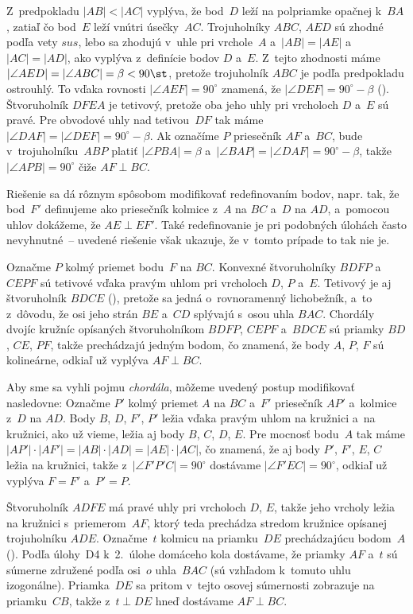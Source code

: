 {%
Z~predpokladu $|AB|<|AC|$ vyplýva, že bod~$D$
leží na polpriamke opačnej k~$BA$, zatiaľ čo bod~$E$ leží vnútri
úsečky~$AC$. Trojuholníky $ABC$, $AED$ sú zhodné podľa
vety $sus$, lebo sa zhodujú v~uhle pri vrchole~$A$
a~$|AB| = |AE|$ a~$|AC| = |AD|$, ako vyplýva
z~definície bodov $D$ a~$E$. Z~tejto zhodnosti máme
$|\angle AED| = |\angle ABC| =\beta<90\st$, pretože trojuholník $ABC$
je podľa predpokladu ostrouhlý. To vďaka rovnosti ${|\angle
AEF| = 90^\circ}$ znamená, že $|\angle DEF| = 90^\circ- \beta$ (\obr).
Štvoruholník $DFEA$ je tetivový, pretože oba jeho uhly pri vrcholoch
$D$ a~$E$ sú pravé. Pre obvodové uhly nad tetivou~$DF$ tak máme
$|\angle DAF|=|\angle DEF|= 90^\circ-\beta$. Ak označíme $P$
priesečník $AF$ a~$BC$, bude v~trojuholníku~$ABP$ platiť $|\angle
PBA| = \beta$ a~$|\angle BAP| = |\angle DAF| = 90^\circ- \beta$, takže
$|\angle APB| = 90^\circ$ čiže $AF \perp BC$.

\poznamka
Riešenie sa dá rôznym spôsobom
modifikovať redefinovaním bodov, napr. tak, že bod~$F'$ definujeme
ako priesečník kolmice z~$A$ na $BC$ a~$D$ na $AD$, a~pomocou uhlov
dokážeme, že $AE \perp EF'$. Také redefinovanie je pri podobných úlohách často
nevyhnutné~-- uvedené riešenie však ukazuje, že v~tomto prípade to tak nie je.
%

Označme $P$ kolmý priemet bodu~$F$ na $BC$.
Konvexné štvoruholníky $BDFP$ a~$CEPF$ sú tetivové vďaka pravým
uhlom pri vrcholoch $D$, $P$ a~$E$. Tetivový je aj štvoruholník
$BDCE$ (\obr), pretože sa jedná o~rovnoramenný lichobežník, a~to
z~dôvodu, že osi jeho strán $BE$ a~$CD$ splývajú s~osou uhla $BAC$.
Chordály dvojíc kružníc
opísaných štvoruholníkom $BDFP$, $CEPF$ a~$BDCE$ sú priamky
$BD$, $CE$, $PF$, takže prechádzajú jedným bodom, čo znamená, že
body $A$, $P$, $F$ sú kolineárne, odkiaľ už vyplýva $AF \perp BC$.

\poznamka
Aby sme sa vyhli pojmu {\it chordála}, môžeme uvedený postup
modifikovať nasledovne: Označme
$P'$ kolmý priemet $A$ na $BC$ a~$F'$ priesečník $AP'$ a~kolmice
z~$D$ na $AD$. Body $B$, $D$, $F'$, $P'$ ležia vďaka pravým uhlom na kružnici
a~na kružnici, ako už vieme, ležia aj body $B$, $C$, $D$, $E$. Pre mocnosť
bodu~$A$ tak máme $|AP'| \cdot |AF'| = {|AB| \cdot |AD|} = |AE| \cdot
|AC|$, čo znamená, že aj body $P'$, $F'$, $E$, $C$ ležia na kružnici,
takže z~$|\angle F'P'C| = 90^\circ$ dostávame $|\angle F'EC| = 90^\circ$,
odkiaľ už vyplýva $F = F'$ a~${P'=P}$.

Štvoruholník $ADFE$ má pravé
uhly pri vrcholoch $D$, $E$,
takže jeho vrcholy ležia na kružnici s~priemerom~$AF$, ktorý teda
prechádza stredom kružnice opísanej trojuholníku $ADE$. Označme~$t$
kolmicu na priamku~$DE$ prechádzajúcu bodom~$A$ (\obr).
Podľa úlohy~D4 k~2.~úlohe domáceho kola dostávame, že
priamky $AF$ a~$t$ sú súmerne združené
podľa osi~$o$ uhla~$BAC$ (sú vzhľadom k~tomuto uhlu izogonálne).
Priamka~$DE$ sa pritom v~tejto osovej súmernosti zobrazuje na priamku~$CB$,
takže z~${t \perp DE}$ hneď dostávame $AF \perp BC$.

}
